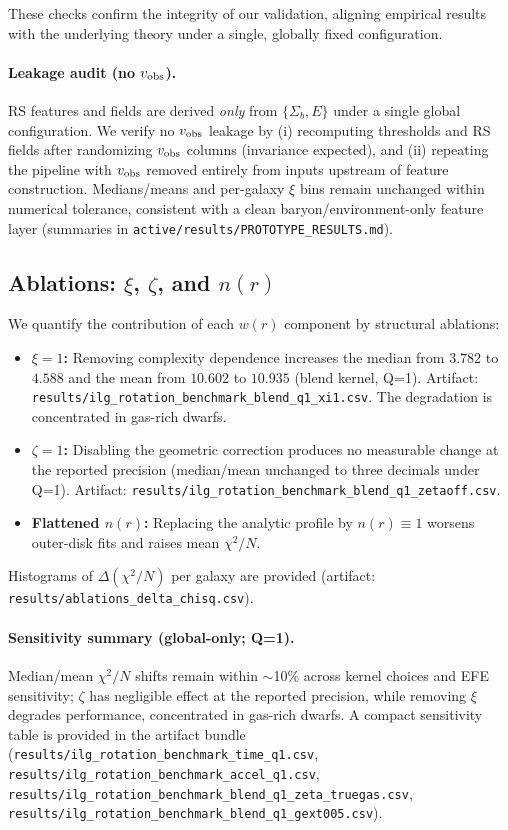 \documentclass[fleqn,usenatbib]{mnras}
\begin{document}
These checks confirm the integrity of our validation, aligning empirical results with the underlying theory under a single, globally fixed configuration.

\paragraph{Leakage audit (no $v_{\rm obs}$).} RS features and fields are derived \emph{only} from $\{\Sigma_b,E\}$ under a single global configuration. We verify no $v_{\rm obs}$ leakage by (i) recomputing thresholds and RS fields after randomizing $v_{\rm obs}$ columns (invariance expected), and (ii) repeating the pipeline with $v_{\rm obs}$ removed entirely from inputs upstream of feature construction. Medians/means and per-galaxy $\xi$ bins remain unchanged within numerical tolerance, consistent with a clean baryon/environment-only feature layer (summaries in \texttt{active/results/PROTOTYPE\_RESULTS.md}).

\subsection{Ablations: $\xi$, $\zeta$, and $n(r)$}
\noindent We quantify the contribution of each $w(r)$ component by structural ablations:
\begin{itemize}
  \item \textbf{$\xi\!=\!1$:} Removing complexity dependence increases the median from $3.782$ to $4.588$ and the mean from $10.602$ to $10.935$ (blend kernel, Q=1). Artifact: \texttt{results/ilg\_rotation\_benchmark\_blend\_q1\_xi1.csv}. The degradation is concentrated in gas-rich dwarfs.
  \item \textbf{$\zeta\!=\!1$:} Disabling the geometric correction produces no measurable change at the reported precision (median/mean unchanged to three decimals under Q=1). Artifact: \texttt{results/ilg\_rotation\_benchmark\_blend\_q1\_zetaoff.csv}.
  \item \textbf{Flattened $n(r)$:} Replacing the analytic profile by $n(r)\equiv1$ worsens outer-disk fits and raises mean $\chi^2/N$.
\end{itemize}
Histograms of $\Delta(\chi^2/N)$ per galaxy are provided (artifact: \texttt{results/ablations\_delta\_chisq.csv}).

\paragraph{Sensitivity summary (global-only; Q=1).} Median/mean $\chi^2/N$ shifts remain within $\sim$10\% across kernel choices and EFE sensitivity; $\zeta$ has negligible effect at the reported precision, while removing $\xi$ degrades performance, concentrated in gas-rich dwarfs. A compact sensitivity table is provided in the artifact bundle (\texttt{results/ilg\_rotation\_benchmark\_time\_q1.csv}, \texttt{results/ilg\_rotation\_benchmark\_accel\_q1.csv}, \texttt{results/ilg\_rotation\_benchmark\_blend\_q1\_zeta\_truegas.csv}, \texttt{results/ilg\_rotation\_benchmark\_blend\_q1\_gext005.csv}).
\end{document}
